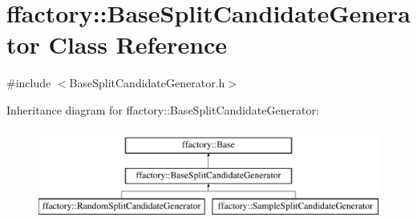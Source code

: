 \hypertarget{classffactory_1_1_base_split_candidate_generator}{\section{ffactory\-:\-:Base\-Split\-Candidate\-Generator Class Reference}
\label{classffactory_1_1_base_split_candidate_generator}
}


{\ttfamily \#include $<$Base\-Split\-Candidate\-Generator.\-h$>$}

Inheritance diagram for ffactory\-:\-:Base\-Split\-Candidate\-Generator\-:\begin{figure}[H]
\begin{center}
\leavevmode
\includegraphics[height=3.000000cm]{classffactory_1_1_base_split_candidate_generator}
\end{center}
\end{figure}
